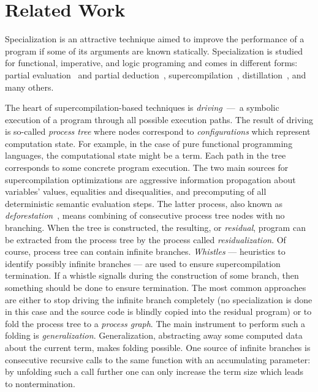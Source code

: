 \section{Related Work}

Specialization is an attractive technique aimed to improve the performance of a program if some of its arguments are known statically.
Specialization is studied for functional, imperative, and logic programing and comes in different forms: partial evaluation~\cite{jonesbook} and partial deduction~\cite{lloyd1991partial}, supercompilation~\cite{soerensen1996positive}, distillation~\cite{hamilton2007distillation}, and many others.


The heart of supercompilation-based techniques is \emph{driving}~---~a symbolic execution of a program through all possible execution paths.
The result of driving is so-called \emph{process tree} where nodes correspond to \emph{configurations} which represent computation state.
For example, in the case of pure functional programming languages, the computational state might be a term.
Each path in the tree corresponds to some concrete program execution.
The two main sources for supercompilation optimizations are aggressive information propagation about variables' values, equalities and disequalities, and precomputing of all deterministic semantic evaluation steps.
The latter process, also known as \emph{deforestation}~\cite{deforestation}, means  combining of consecutive process tree nodes with no branching.
When the tree is constructed, the resulting, or \emph{residual}, program can be extracted from the process tree by the process called \emph{residualization}.
Of course, process tree can contain infinite branches.
\emph{Whistles} --- heuristics to identify possibly infinite branches --- are used to ensure supercompilation termination.
If a whistle signalls during the construction of some branch, then something should be done to ensure termination.
The most common approaches are either to stop driving the infinite branch completely (no specialization is done in this case and the source code is blindly copied into the residual program) or to fold the process tree to a \emph{process graph}.
The main instrument to perform such a folding is \emph{generalization}.
Generalization, abstracting away some computed data about the current term, makes folding possible.
One source of infinite branches is consecutive recursive calls to the same function with an accumulating parameter: by unfolding such a call further one can only increase the term size which leads to nontermination.
